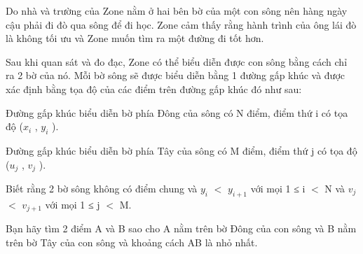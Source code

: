Do nhà và trường của Zone nằm ở hai bên bờ của một con sông nên hàng ngày cậu phải đi đò qua sông để đi học. Zone cảm thấy rằng hành trình của ông lái đò là không tối ưu và Zone muốn tìm ra một đường đi tốt hơn.  

   Sau khi quan sát và đo đạc, Zone có thể biểu diễn được con sông bằng cách chỉ ra 2 bờ của nó. Mỗi bờ sông sẽ được biểu diễn bằng 1 đường gấp khúc và được xác định bằng tọa độ của các điểm trên đường gấp khúc đó như sau:  

   Đường gấp khúc biểu diễn bờ phía Đông của sông có N điểm, điểm thứ i có tọa độ ($x_{i}$   , $y_{i}$   ).  

   Đường gấp khúc biểu diễn bờ phía Tây của sông có M điểm, điểm thứ j có tọa độ ($u_{j}$   , $v_{j}$   ).  

   Biết rằng 2 bờ sông không có điểm chung và $y_{i}$   $<$ $y_{i+1}$   với mọi 1 ≤ i $<$ N và $v_{j}$   $<$ $v_{j+1}$   với mọi 1 ≤ j $<$ M.  

   Bạn hãy tìm 2 điểm A và B sao cho A nằm trên bờ Đông của con sông và B nằm trên bờ Tây của con sông và khoảng cách AB là nhỏ nhất.